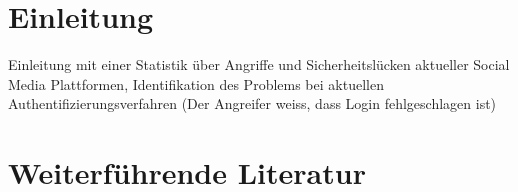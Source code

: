 \documentclass{sigchi}
\def\plainkeywords{Authors' choice; of terms; separated; by
  semicolons; include commas, within terms only; required.}
\begin{document}
%

\section{Einleitung}
Einleitung mit einer Statistik über Angriffe und Sicherheitslücken aktueller Social Media Plattformen, Identifikation des Problems bei aktuellen Authentifizierungsverfahren (Der Angreifer weiss, dass Login fehlgeschlagen ist)

\section{Weiterführende Literatur}

 
\end{document}
